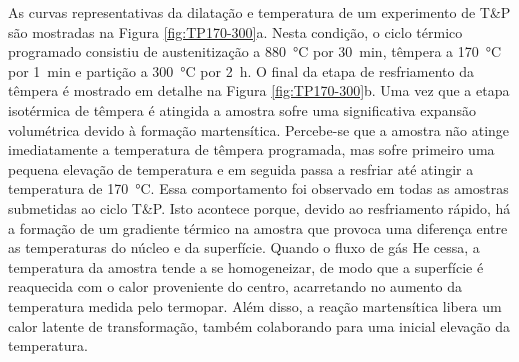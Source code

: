 As curvas representativas da dilatação e temperatura de um experimento de T\&P são mostradas na Figura \ref{fig:TP170-300}a. Nesta condição, o ciclo térmico programado consistiu de austenitização a \SI{880}{\degreeCelsius} por 30~min, têmpera a \SI{170}{\degreeCelsius} por 1~min e partição a \SI{300}{\degreeCelsius} por 2~h. O final da etapa de resfriamento da têmpera é mostrado em detalhe na Figura \ref{fig:TP170-300}b. Uma vez que a etapa isotérmica de têmpera é atingida a amostra sofre uma significativa expansão volumétrica devido à formação martensítica. Percebe-se que a amostra não atinge imediatamente a temperatura de têmpera programada, mas sofre primeiro uma pequena elevação de temperatura e em seguida passa a resfriar até atingir a temperatura de \SI{170}{\degreeCelsius}. Essa comportamento foi observado em todas as amostras submetidas ao ciclo T\&P. Isto acontece porque, devido ao resfriamento rápido, há a formação de um gradiente térmico na amostra que provoca uma diferença entre as temperaturas do núcleo e da superfície. Quando o fluxo de gás He cessa, a temperatura da amostra tende a se homogeneizar, de modo que a superfície é reaquecida com o calor proveniente do centro, acarretando no aumento da temperatura medida pelo termopar. Além disso, a reação martensítica libera um calor latente de transformação, também colaborando para uma inicial elevação da temperatura.

